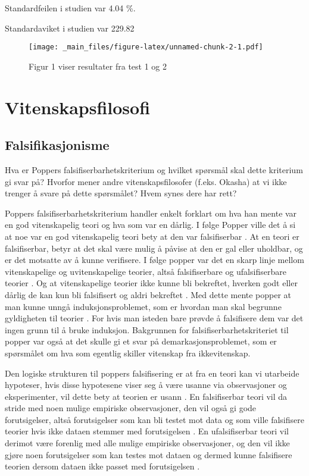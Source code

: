 \documentclass[
]{book}
\begin{document}
Standardfeilen i studien var 4.04 \%.

Standardaviket i studien var 229.82

\begin{figure}
\centering
\texttt{[image: \_main\_files/figure-latex/unnamed-chunk-2-1.pdf]}
\caption{\label{fig:unnamed-chunk-2}Figur 1 viser resultater fra test 1 og 2}
\end{figure}

\hypertarget{vitenskapsfilosofi}{%
\chapter{Vitenskapsfilosofi}\label{vitenskapsfilosofi}}

\hypertarget{falsifikasjonisme}{%
\section{Falsifikasjonisme}\label{falsifikasjonisme}}

Hva er Poppers falsifiserbarhetskriterium og hvilket spørsmål skal dette kriterium gi svar på?
Hvorfor mener andre vitenskapsfilosofer (f.eks. Okasha) at vi ikke trenger å svare på dette spørsmålet?
Hvem synes dere har rett?

Poppers falsifiserbarhetskriterium handler enkelt forklart om hva han mente var en god vitenskapelig teori og hva som var en dårlig.
I følge Popper ville det å si at noe var en god vitenskapelig teori bety at den var falsifiserbar \citet{okasha2016}.
At en teori er falsifiserbar, betyr at det skal være mulig å påvise at den er gal eller uholdbar, og er det motsatte av å kunne verifisere.
I følge popper var det en skarp linje mellom vitenskapelige og uvitenskapelige teorier, altså falsifiserbare og ufalsifiserbare teorier \citet{okasha2016}.
Og at vitenskapelige teorier ikke kunne bli bekreftet, hverken godt eller dårlig de kan kun bli falsifisert og aldri bekreftet \citet{okasha2016}.
Med dette mente popper at man kunne unngå induksjonsproblemet, som er hvordan man skal begrunne gyldigheten til teorier \citet{okasha2016}.
For hvis man isteden bare prøvde å falsifisere dem var det ingen grunn til å bruke induksjon.
Bakgrunnen for falsifiserbarhetskriteriet til popper var også at det skulle gi et svar på demarkasjonsproblemet, som er spørsmålet om hva som egentlig skiller vitenskap fra ikkevitenskap.

Den logiske strukturen til poppers falsifisering er at fra en teori kan vi utarbeide hypoteser, hvis disse hypotesene viser seg å være usanne via observasjoner og eksperimenter, vil dette bety at teorien er usann \citet{okasha2016}.
En falsifiserbar teori vil da stride med noen mulige empiriske observasjoner, den vil også gi gode forutsigelser, altså forutsigelser som kan bli testet mot data og som ville falsifisere teorier hvis ikke dataen stemmer med forutsigelsen \citet{okasha2016}.
En ufalsifiserbar teori vil derimot være forenlig med alle mulige empiriske observasjoner, og den vil ikke gjøre noen forutsigelser som kan testes mot dataen og dermed kunne falsifisere teorien dersom dataen ikke passet med forutsigelsen \citet{okasha2016}.
\end{document}
